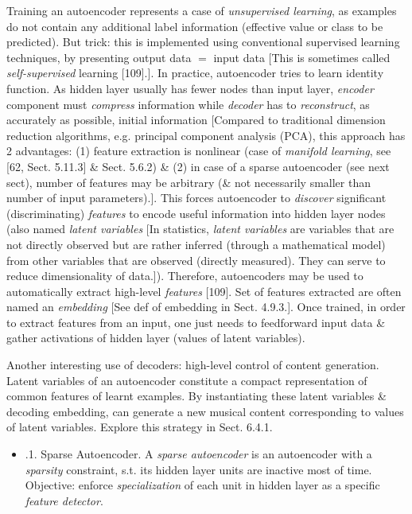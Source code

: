 \documentclass{article}
\begin{document}
\begin{itemize}
\begin{itemize}
		Training an autoencoder represents a case of {\it unsupervised learning}, as examples do not contain any additional label information (effective value or class to be predicted). But trick: this is implemented using conventional supervised learning techniques, by presenting output data $=$ input data [This is sometimes called {\it self-supervised} learning [109].]. In practice, autoencoder tries to learn identity function. As hidden layer usually has fewer nodes than input layer, {\it encoder} component must {\it compress} information while {\it decoder} has to {\it reconstruct}, as accurately as possible, initial information [Compared to traditional dimension reduction algorithms, e.g. principal component analysis (PCA), this approach has 2 advantages: (1) feature extraction is nonlinear (case of {\it manifold learning}, see [62, Sect. 5.11.3] \& Sect. 5.6.2) \& (2) in case of a sparse autoencoder (see next sect), number of features may be arbitrary (\& not necessarily smaller than number of input parameters).]. This forces autoencoder to {\it discover} significant (discriminating) {\it features} to encode useful information into hidden layer nodes (also named {\it latent variables} [In statistics, {\it latent variables} are variables that are not directly observed but are rather inferred (through a mathematical model) from other variables that are observed (directly measured). They can serve to reduce dimensionality of data.]). Therefore, autoencoders may be used to automatically extract high-level {\it features} [109]. Set of features extracted are often named an {\it embedding} [See def of embedding in Sect. 4.9.3.]. Once trained, in order to extract features from an input, one just needs to feedforward input data \& gather activations of hidden layer (values of latent variables).
		
		Another interesting use of decoders: high-level control of content generation. Latent variables of an autoencoder constitute a compact representation of common features of learnt examples. By instantiating these latent variables \& decoding embedding, can generate a new musical content corresponding to values of latent variables. Explore this strategy in Sect. 6.4.1.
		\begin{itemize}
			\item {.1. Sparse Autoencoder.} A {\it sparse autoencoder} is an autoencoder with a {\it sparsity} constraint, s.t. its hidden layer units are inactive most of time. Objective: enforce {\it specialization} of each unit in hidden layer as a specific {\it feature detector}.
			

\end{itemize}
\end{itemize}
\end{itemize}
\end{document}

